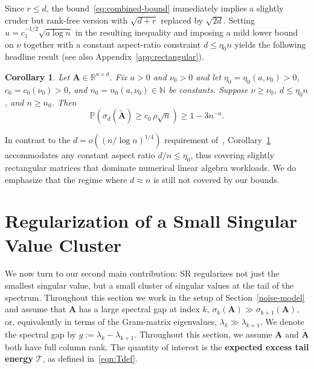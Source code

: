 \documentclass{article}
\newcommand{\twonorm}[1]{\|#1\|_2}
\newcommand{\Ex}[1]{\mbox{}\mathbb{E}\left[#1\right]}
\newcommand{\pr}[1]{\mbox{}\mathbb{P}\left(#1\right)}
\newcommand{\R}{\mathbb{R}} %
\newcommand{\Ab}{\mathbf{A}}
\newcommand{\Eb}{\mathbf{E}}
\newcommand{\Pb}{\mathbf{P}}
\newcommand{\Abtil}{\tilde{\Ab}}
\newcommand{\Tcal}{\mathcal{T}}
\newcommand{\BlackBox}{\rule{1.5ex}{1.5ex}}  %
\newenvironment{proof}{\par\noindent{\bf Proof\ }}{\hfill\BlackBox\par\medskip}
\newtheorem{corollary}[theorem]{Corollary}
\newcommand{\NN}{\mathbb{N}} %
\newcommand{\rbr}[1]{\left(#1\right)}
\begin{document}
Since $r \le d$, the bound~\eqref{eq:combined-bound} immediately implies a slightly cruder but rank-free version with $\sqrt{d+r}$ replaced by $\sqrt{2d}$. Setting $u = c_1^{-1/2}\sqrt{a\log n}$ in the resulting inequality and imposing a mild lower bound on $\nu$ together with a constant aspect-ratio constraint $d \le \eta_0 n$ yields the following headline result (see also Appendix~\ref{app:rectangular}).
%
\begin{corollary}\label{cor:rectangular}
Let $\Ab \in \R^{n \times d}$. Fix $a > 0$ and $\nu_0 > 0$ and let $\eta_0 = \eta_0(a,\nu_0) > 0$, $c_0 = c_0(\nu_0) > 0$, and $n_0 = n_0(a,\nu_0) \in \NN$ be constants. Suppose $\nu \ge \nu_0$, $d \le \eta_0 n$, and  $n \ge n_0$. Then
\begin{equation}\label{eq:rectangular-bound}
    \pr{\sigma_d(\Abtil) \ge c_0\,\rho\sqrt{n}} \ge 1 - 3 n^{-a}.
\end{equation}
\end{corollary}
%
In contrast to the $d = o\rbr{(n/\log n)^{1/4}}$ requirement of~\citet{dexter2025stochastic}, Corollary~\ref{cor:rectangular} accommodates any constant aspect ratio $d/n \le \eta_0$, thus covering slightly rectangular matrices that dominate numerical linear algebra workloads. We do emphasize that the regime where $d\approx n$ is still not covered by our bounds.

\section{Regularization of a Small Singular Value Cluster}\label{sec:smallcluster}

We now turn to our second main contribution: SR regularizes not just the smallest singular value, but a small cluster of singular values at the tail of the spectrum. Throughout this section we work in the setup of Section~\ref{noise-model} and assume that $\Ab$ has a large spectral gap at index $k$, $ \sigma_k(\Ab) \gg \sigma_{k+1}(\Ab),$ or, equivalently in terms of the Gram-matrix eigenvalues, $\lambda_k \gg \lambda_{k+1}$. We denote the spectral gap by $g := \lambda_k - \lambda_{k+1}$. Throughout this section, we assume $\Ab$ and $\Abtil$ both have full column rank. The quantity of interest is the \textbf{expected excess tail energy} $\Tcal$, as defined in~\eqref{eqn:Tdef}.
\end{document}
